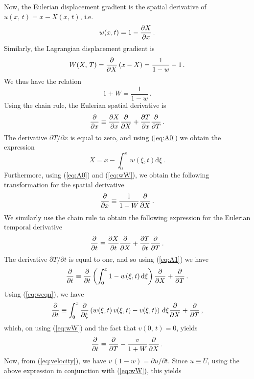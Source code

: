 Now, the Eulerian displacement gradient is the spatial derivative of $u(x,\,t) =x-X(x,\,t)$, i.e.
\begin{equation}
w{(x,t)}=1-\frac{\partial X}{\partial x}\,.
\label{eq:A0}
\end{equation}
Similarly, the Lagrangian displacement gradient is
\begin{equation*}
W(X,\,T)=\frac{\partial }{\partial X}\left(x-X\right)=\frac{1}{1-w}-1\,.
\end{equation*}
We thus have the relation
\begin{equation}
\label{eq:wW}
1+W=\frac{1}{1-w}\,.
\end{equation}
Using the chain rule, the Eulerian spatial derivative is
\begin{equation*}
\frac{\partial }{\partial x}\equiv\frac{\partial X}{\partial x}\frac{\partial }{\partial X}+\frac{\partial T}{\partial x}\frac{\partial }{\partial T}\,.
\end{equation*}
The derivative $\partial T/\partial x$ is equal to zero, and using (\ref{eq:A0}) we obtain the expression
\begin{equation}
X=x-\int_{0}^{x}\,w(\xi,t) \mathrm{d}\xi\,.
\label{eq:A1}
\end{equation}
Furthermore, using (\ref{eq:A0}) and (\ref{eq:wW}), we obtain the following transformation for the spatial derivative
\begin{equation}
\frac{\partial }{\partial x}\equiv \frac{1}{1+W}\frac{\partial }{\partial X}\,.
\label{eq:A2}
\end{equation}
We similarly use the chain rule to obtain the following expression for the Eulerian temporal derivative
\begin{equation*}
\frac{\partial }{\partial t}\equiv\frac{\partial X}{\partial t}\frac{\partial }{\partial X}+\frac{\partial T}{\partial t}\frac{\partial }{\partial T}\,.
\end{equation*}
The derivative $\partial T/\partial t$ is equal to one, and so using (\ref{eq:A1}) we have
\begin{equation*}
\frac{\partial }{\partial t}\equiv\frac{\partial }{\partial t}\left(\int^{x}_{0} 1 - w(\xi,t)\,\mathrm{d}\xi\right)\frac{\partial }{\partial X}+\frac{\partial }{\partial T}\,.
\end{equation*}
Using (\ref{eq:weqn}), we have
\begin{equation*}
\frac{\partial }{\partial t} \equiv \int^{x}_{0} \frac{\partial }{\partial \xi}\left(w(\xi,t)\,v(\xi,t)-v(\xi,t)\right) \,\mathrm{d}\xi\frac{\partial }{\partial X}+\frac{\partial }{\partial T}\,,
\end{equation*}
which, on using (\ref{eq:wW}) and the fact that $v(0,\,t)=0$, yields
\begin{equation*}
\frac{\partial }{\partial t}\equiv\frac{\partial }{\partial T}-\frac{v}{1+W}\frac{\partial }{\partial X}\,.
\end{equation*}
Now, from (\ref{eq:velocity}), we have $v\,(1-w)=\partial{u}/\partial{t}$. Since $u\equiv U$, using the above expression in conjunction with (\ref{eq:wW}), this yields
